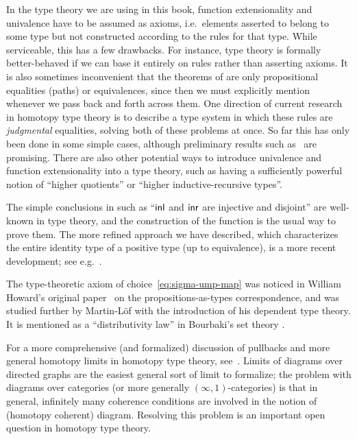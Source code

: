 In the type theory we are using in this book, function extensionality and univalence have to be assumed as axioms, i.e.\ elements asserted to belong to some type but not constructed according to the rules for that type.
While serviceable, this has a few drawbacks.
For instance, type theory is formally better-behaved if we can base it entirely on rules rather than asserting axioms.
It is also sometimes inconvenient that the theorems of  are only propositional equalities (paths) or equivalences, since then we must explicitly mention whenever we pass back and forth across them.
One direction of current research in homotopy type theory is to describe a type system in which these rules are \emph{judgmental} equalities, solving both of these problems at once.
So far this has only been done in some simple cases, although preliminary results such as~\cite{lh:canonicity} are promising.
There are also other potential ways to introduce univalence and function extensionality into a type theory, such as having a sufficiently powerful notion of ``higher quotients'' or ``higher inductive-recursive types''.

The simple conclusions in  such as ``${\mathsf{inl}}$ and ${\mathsf{inr}}$ are injective and disjoint'' are well-known in type theory, and the construction of the function \encode is the usual way to prove them.
The more refined approach we have described, which characterizes the entire identity type of a positive type (up to equivalence), is a more recent development; see e.g.~\cite{ls:pi1s1}.

%
The type-theoretic axiom of choice~\eqref{eq:sigma-ump-map} was noticed in William Howard's original paper~\cite{howard:pat} on the propositions-as-types correspondence, and was studied further by Martin-L\"of with the introduction of his dependent type theory.  It is mentioned as a ``distributivity law'' in Bourbaki's set theory \cite{Bourbaki}.%

For a more comprehensive (and formalized) discussion of pullbacks and more general homotopy limits in homotopy type theory, see~\cite{AKL13}.
Limits of diagrams over directed graphs are the easiest general sort of limit to formalize; the problem with diagrams over categories (or more generally $(\infty,1)$-categories)
%
%
is that in general, infinitely many coherence conditions are involved in the notion of (homotopy coherent) diagram.
Resolving this problem is an important open question in homotopy type theory.

